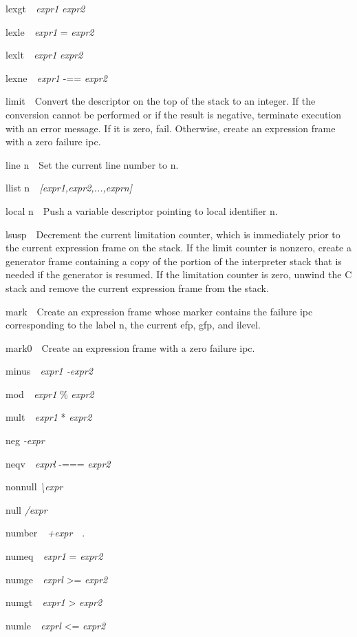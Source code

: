 lexgt\textit{\ \ expr1 }{\guillemotright} \textit{expr2}


lexle\textit{\ \ expr1 }{\guillemotleft}= \textit{expr2}


lexlt\textit{\ \ expr1 }{\guillemotleft} \textit{expr2}


lexne\textit{\ \ expr1 }{}-== \textit{expr2}


limit\ \ Convert the descriptor on the top of the stack to an
integer. If the conversion cannot be performed or if the result is
negative, terminate execution with an error message. If it is zero,
fail. Otherwise, create an expression frame with a zero failure ipc.


line n\ \ Set the current line number to n.


llist n\textit{\ \ [expr1,expr2,...,exprn]}


local n\ \ Push a variable descriptor pointing to local identifier n.


lsusp\ \ Decrement the current limitation counter, which is
immediately prior to the current expression frame on the stack. If the
limit counter is nonzero, create a generator frame containing a copy
of the portion of the interpreter stack that is needed if the
generator is resumed. If the limitation counter is zero, unwind the C
stack and remove the current expression frame from the stack.


mark\ \ Create an expression frame whose marker contains the failure
ipc corresponding to the label n, the current efp, gfp, and ilevel.


mark0\ \ Create an expression frame with a zero failure ipc.


minus\textit{\ \ expr1 -expr2}


mod\textit{\ \ expr1 }\% \textit{expr2}


mult\textit{\ \ expr1 }* \textit{expr2}


neg \textit{{}-expr}


neqv\textit{\ \ exprl }{}-=== \textit{expr2}


nonnull \textit{{\textbackslash}expr}


null \textit{/expr}


number\textit{\ \ +expr}\ \ .


numeq\textit{\ \ expr1 }= \textit{expr2}


numge\textit{\ \ exprl }{\textgreater}= \textit{expr2}


numgt\textit{\ \ expr1 }{\textgreater} \textit{expr2}


numle\textit{\ \ exprl }{\textless}= \textit{expr2}


